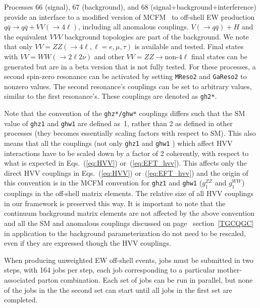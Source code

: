 \documentclass[aps,superscriptaddress,nofootinbib]{revtex4}
\begin{document}
Processes 66 (signal), 67 (background), and 68 (signal+background+interference) provide an interface to a modified 
version of MCFM~\cite{Campbell:2010ff} to off-shell EW production $q\bar{q} \to q\bar{q} + VV(\to 4\ell)$, 
including all anomalous couplings.  $V(\to q\bar{q})+H$ and the equivalent $VVV$ background topologies are part of the background.
We note that only $VV=ZZ(\to 4\ell, \ell=e,\mu,\tau)$ is available and tested. 
Final states with $VV=WW(\to 2\ell 2\nu)$ and other $VV=ZZ\to$non-$4\ell$ final states
can be generated but are in a beta version that is not fully tested. 
For these processes, a second spin-zero resonance can be activated by setting \verb|MReso2| and \verb|GaReso2| to 
nonzero values.  The second resonance's couplings can be set to arbitrary values, similar to the first resonance's. 
These couplings are denoted as \verb|gh2*|. 

Note that the convention of the \verb|ghz*/ghw*| couplings differs such that the SM value of \verb|ghz1| and \verb|ghw1| 
are defined as~1, rather than 2 as defined in other processes (they becomes essentially scaling factors with respect to SM). 
This also means that all the couplings (not only  \verb|ghz1| and \verb|ghw1| ) which affect HVV interactions have to be 
scaled down by a factor of 2 coherently, with respect to what is expected in Eqs.~(\ref{eq:HVV}) or~(\ref{eq:EFT_hvv}).
This affects only the direct HVV couplings in Eqs.~(\ref{eq:HVV}) or~(\ref{eq:EFT_hvv}) and the origin of
this convention is in the MCFM convention for \verb|ghz1| and \verb|ghw1| ($g_1^{ZZ}$ and $g_1^{WW}$)
couplings in the off-shell matrix elements. The relative size of all HVV couplings in our framework is preserved this way. 
It is important to note that the continuum background matrix elements are not affected by the above convention 
and all the SM and anomalous couplings discussed on page~\pageref{TGCQGC} section~\ref{TGCQGC} in application 
to the background parameterization do not need to be rescaled, even if they are expressed though the HVV couplings. 

When producing unweighted EW off-shell events, jobs must be submitted in two steps, with 164 jobs per step, 
each job corresponding to a particular mother-associated parton combination.  Each set of jobs can be run in parallel, 
but none of the jobs in the the second set can start until all jobs in the first set are completed.
\end{document}
